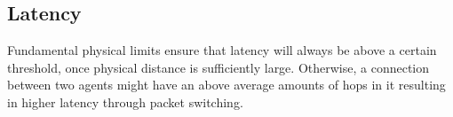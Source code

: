 \subsection{Latency}
Fundamental physical limits ensure that latency will always be above a certain threshold, once physical distance is sufficiently large. Otherwise, a connection between two agents might have an above average amounts of hops in it resulting in higher latency through packet switching.
